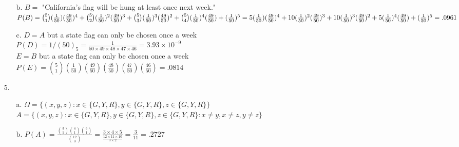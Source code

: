 \documentclass[11pt]{amsart}
\theoremstyle{definition}
\begin{document}
\begin{itemize}
\begin{itemize}
    \item[b.] $B=$ "California’s flag will be hung at least once next week." \\
              $P(B)={5\choose 1}(\frac{1}{50})(\frac{49}{50})^4 +
                    {5\choose 2}(\frac{1}{50})^2(\frac{49}{50})^3+
                    {5\choose 3}(\frac{1}{50})^3(\frac{49}{50})^2+
                    {5\choose 4}(\frac{1}{50})^4(\frac{49}{50})+
                    (\frac{1}{50})^5
                    \\=5(\frac{1}{50})  (\frac{49}{50})^4 +
                    10  (\frac{1}{50})^2(\frac{49}{50})^3+
                    10  (\frac{1}{50})^3(\frac{49}{50})^2+
                    5   (\frac{1}{50})^4(\frac{49}{50})+
                        (\frac{1}{50})^5=.0961$

    \item[c.] $D=A$ but a state flag can only be chosen once a week \\
              $P(D)=1/(50)_5=\frac{1}{50\times 49\times 48\times 47\times 46}=3.93\times 10^{-9}$ \\
              $E=B$ but a state flag can only be chosen once a week \\
              $P(E)={5\choose 1}(\frac{1}{50})(\frac{49}{50})(\frac{48}{50})(\frac{47}{50})(\frac{46}{50})=.0814$

\end{itemize}

\item[5.]
\begin{itemize}
    \item[a.] $\Omega = \{(x,y,z):x\in\{G,Y,R\},y\in\{G,Y,R\},z\in\{G,Y,R\}\}$ \\
              $A      = \{(x,y,z):x\in\{G,Y,R\},y\in\{G,Y,R\},z\in\{G,Y,R\}:x\ne y, x\ne z, y\ne z\}$

    \item[b.] $P(A) = \frac{{3\choose 1}{4\choose 1}{5\choose 1}}
               {{12 \choose 3}}
               =\frac{3\times 4\times 5}{\frac{12\times 11\times 10}{3\times 2}}
               =\frac{3}{11}=.2727$
    
\end{itemize}

\end{itemize}
\end{document}
